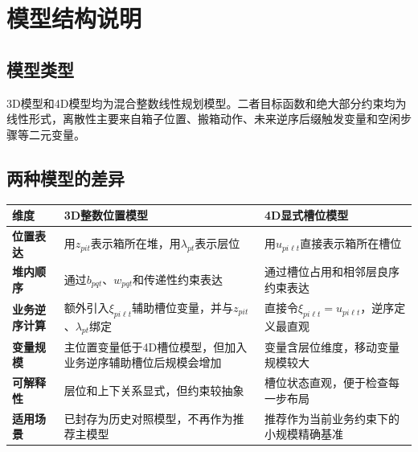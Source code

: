\documentclass[11pt,a4paper]{ctexart}
\begin{document}
\section{模型结构说明}

\subsection{模型类型}
3D模型和4D模型均为混合整数线性规划模型。二者目标函数和绝大部分约束均为线性形式，离散性主要来自箱子位置、搬箱动作、未来逆序后缀触发变量和空闲步骤等二元变量。

\subsection{两种模型的差异}
\begin{table}[H]
\centering
\renewcommand{\arraystretch}{1.35}
\begin{tabularx}{0.95\textwidth}{>{\bfseries}p{3.0cm} X X}
\toprule
维度 & 3D整数位置模型 & 4D显式槽位模型 \\
\midrule
位置表达 & 用$z_{pit}$表示箱所在堆，用$\lambda_{pt}$表示层位 & 用$u_{pi\ell t}$直接表示箱所在槽位 \\
堆内顺序 & 通过$b_{pqt}$、$w_{pqt}$和传递性约束表达 & 通过槽位占用和相邻层良序约束表达 \\
业务逆序计算 & 额外引入$\xi_{pi\ell t}$辅助槽位变量，并与$z_{pit}$、$\lambda_{pt}$绑定 & 直接令$\xi_{pi\ell t}=u_{pi\ell t}$，逆序定义最直观 \\
变量规模 & 主位置变量低于4D槽位模型，但加入业务逆序辅助槽位后规模会增加 & 变量含层位维度，移动变量规模较大 \\
可解释性 & 层位和上下关系显式，但约束较抽象 & 槽位状态直观，便于检查每一步布局 \\
适用场景 & 已封存为历史对照模型，不再作为推荐主模型 & 推荐作为当前业务约束下的小规模精确基准 \\
\bottomrule
\end{tabularx}
\end{table}
\end{document}
